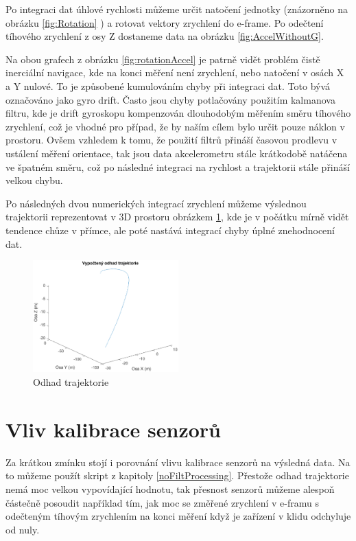 Po integraci dat úhlové rychlosti můžeme určit natočení jednotky (znázorněno na obrázku \ref{fig:Rotation} ) a rotovat vektory zrychlení do e-frame. Po odečtení tíhového zrychlení z osy Z dostaneme data na obrázku \ref{fig:AccelWithoutG}.

Na obou grafech z obrázku \ref{fig:rotationAccel} je patrně vidět problém čistě inerciální navigace, kde na konci měření není zrychlení, nebo natočení v osách X a Y nulové. To je způsobené kumulováním chyby při integraci dat. Toto bývá označováno jako gyro drift. Často jsou chyby potlačovány použitím kalmanova filtru, kde je drift gyroskopu kompenzován dlouhodobým měřením směru tíhového zrychlení, což je vhodné pro případ, že by naším cílem bylo určit pouze náklon v prostoru. Ovšem vzhledem k tomu, že použití filtrů přináší časovou prodlevu v ustálení měření orientace, tak jsou data akcelerometru stále krátkodobě natáčena ve špatném směru, což po následné integraci na rychlost a trajektorii stále přináší velkou chybu.

Po následných dvou numerických integrací zrychlení můžeme výslednou trajektorii reprezentovat v 3D prostoru obrázkem \ref{fig:Trajectory}, kde je v počátku mírně vidět tendence chůze v přímce, ale poté nastává integrací chyby úplné znehodnocení dat. 

\begin{figure}[h]
     \centering
         \includegraphics[width=0.5\textwidth]{obrazky/matlab/1measTraj}
         \caption{Odhad trajektorie}
        \label{fig:Trajectory}
\end{figure}

\section{Vliv kalibrace senzorů}
Za krátkou zmínku stojí i porovnání vlivu kalibrace senzorů na výsledná data. Na to můžeme použít skript z kapitoly \ref{noFiltProcessing}. Přestože odhad trajektorie nemá moc velkou vypovídající hodnotu, tak přesnost senzorů můžeme alespoň částečně posoudit například tím, jak moc se změřené zrychlení v e-framu s odečteným tíhovým zrychlením na konci měření když je zařízení v klidu odchyluje od nuly.



